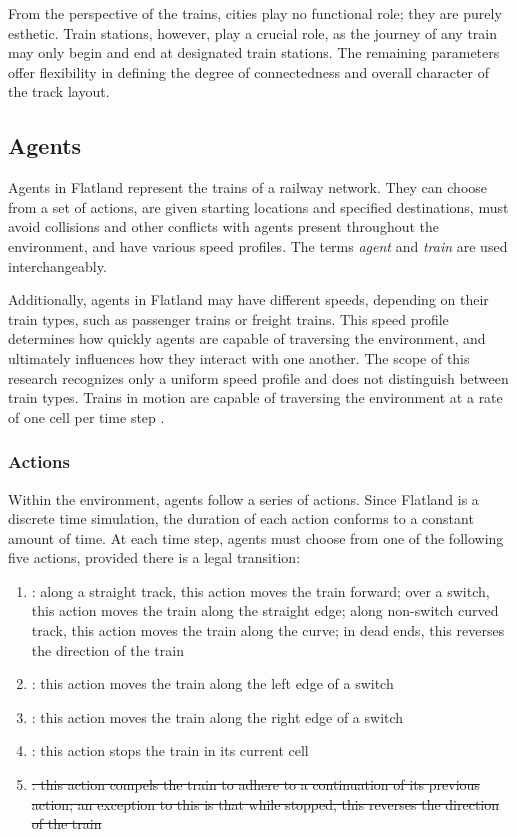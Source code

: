 \documentclass[11pt]{article}
\begin{document}
\noindent From the perspective of the trains, cities play no functional role; they are purely esthetic. Train stations, however, play a crucial role, as the journey of any train may only begin and end at designated train stations.  The remaining parameters offer flexibility in defining the degree of connectedness and overall character of the track layout. \medskip


\subsection{Agents}
\label{sec:Agents}
Agents in Flatland represent the trains of a railway network.  They can choose from a set of actions, are given starting locations and specified destinations, must avoid collisions and other conflicts with agents present throughout the environment, and have various speed profiles.  The terms \textit{agent} and \textit{train} are used interchangeably.

Additionally, agents in Flatland may have different speeds, depending on their train types, such as passenger trains or freight trains.  This speed profile determines how quickly agents are capable of traversing the environment, and ultimately influences how they interact with one another.  The scope of this research recognizes only a uniform speed profile and does not distinguish between train types.  Trains in motion are capable of traversing the environment at a rate of one cell per time step \citep{baeiegljmomonyspwaaggo21a}.

\subsubsection{Actions}
\label{sec:Actions}
Within the environment, agents follow a series of actions.  Since Flatland is a discrete time simulation, the duration of each action conforms to a constant amount of time.    At each time step, agents must choose from one of the following five actions, provided there is a legal transition: 
\begin{enumerate}
  \item {}: along a straight track, this action moves the train forward; over a switch, this action moves the train along the straight edge; along non-switch curved track, this action moves the train along the curve; in dead ends, this reverses the direction of the train
  \item {}: this action moves the train along the left edge of a switch
  \item {}: this action moves the train along the right edge of a switch
   \item {}: this action stops the train in its current cell
  \item \sout{: this action compels the train to adhere to a continuation of its previous action; an exception to this is that while stopped, this reverses the direction of the train}
\end{enumerate} \smallskip
\end{document}
